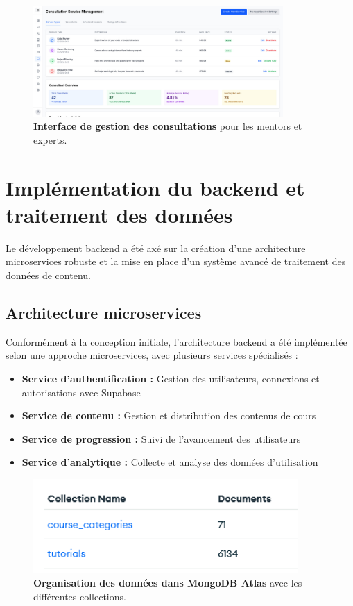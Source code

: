 \begin{figure}[h!]
  \centering
  \includegraphics[width=0.85\textwidth,keepaspectratio]{old-reports/week_4_img/consultingmana.jpeg}
  \caption{\textbf{Interface de gestion des consultations} pour les mentors et experts.}
  \label{fig:consulting_management}
\end{figure}

\section{Implémentation du backend et traitement des données}

Le développement backend a été axé sur la création d'une architecture microservices robuste et la mise en place d'un système avancé de traitement des données de contenu.

\subsection{Architecture microservices}

Conformément à la conception initiale, l'architecture backend a été implémentée selon une approche microservices, avec plusieurs services spécialisés :

\begin{itemize}
  \item \textbf{Service d'authentification :} Gestion des utilisateurs, connexions et autorisations avec Supabase
  \item \textbf{Service de contenu :} Gestion et distribution des contenus de cours
  \item \textbf{Service de progression :} Suivi de l'avancement des utilisateurs
  \item \textbf{Service d'analytique :} Collecte et analyse des données d'utilisation
\end{itemize}

\begin{figure}[h!]
  \centering
  \includegraphics[width=0.9\textwidth,keepaspectratio]{week_3_img/Screenshot 2025-05-19 234047.png}
  \caption{\textbf{Organisation des données dans MongoDB Atlas} avec les différentes collections.}
  \label{fig:mongodb}
\end{figure}

